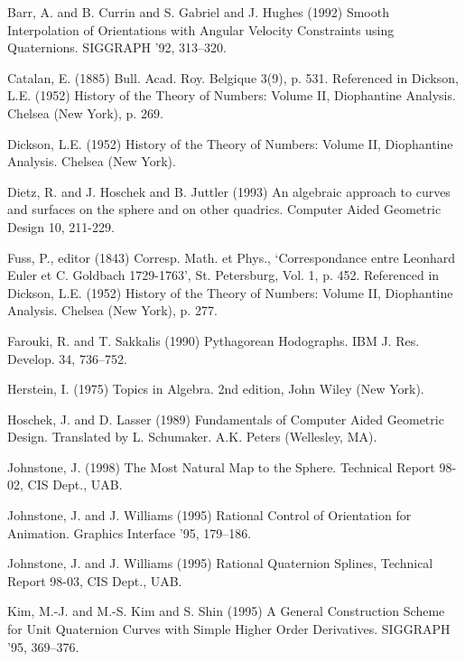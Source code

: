 
\begin{thebibliography}{Lozano-Perez 83}

Barr, A. and B. Currin and S. Gabriel and J. Hughes (1992)
Smooth Interpolation of Orientations with Angular Velocity Constraints
using Quaternions.
SIGGRAPH '92, 313--320.

Catalan, E. (1885) Bull. Acad. Roy. Belgique 3(9), p. 531.
Referenced in Dickson, L.E. (1952) History of the Theory of Numbers: Volume II,
Diophantine Analysis.  Chelsea (New York), p. 269.

Dickson, L.E. (1952) History of the Theory of Numbers: Volume II,
Diophantine Analysis.  Chelsea (New York).

Dietz, R. and J. Hoschek and B. Juttler (1993)
An algebraic approach to curves and surfaces on the sphere and
on other quadrics.
Computer Aided Geometric Design 10, 211-229.

Fuss, P., editor (1843) Corresp. Math. et Phys.,
`Correspondance entre Leonhard Euler et C. Goldbach 1729-1763',
St. Petersburg, Vol. 1, p. 452.  
Referenced in Dickson, L.E. (1952) History of the Theory of Numbers: Volume II,
Diophantine Analysis.  Chelsea (New York), p. 277.

Farouki, R. and T. Sakkalis (1990)
Pythagorean Hodographs.
IBM J. Res. Develop. 34, 736--752.

Herstein, I. (1975) Topics in Algebra.
2nd edition, John Wiley (New York).

Hoschek, J. and D. Lasser (1989)
Fundamentals of Computer Aided Geometric Design.
Translated by L. Schumaker.  A.K. Peters (Wellesley, MA).

Johnstone, J. (1998)
The Most Natural Map to the Sphere.
Technical Report 98-02, CIS Dept., UAB.

Johnstone, J. and J. Williams (1995)
Rational Control of Orientation for Animation.
Graphics Interface '95, 179--186.

Johnstone, J. and J. Williams (1995)
Rational Quaternion Splines,
Technical Report 98-03, CIS Dept., UAB.

Kim, M.-J. and M.-S. Kim and S. Shin (1995)
A General Construction Scheme for Unit Quaternion Curves with Simple
Higher Order Derivatives.
SIGGRAPH '95, 369--376.


\end{thebibliography}
